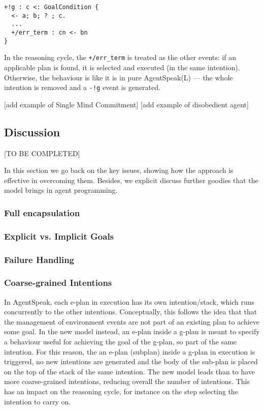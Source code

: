 {\small
\begin{verbatim}
+!g : c <: GoalCondition {
  <- a; b; ? ; c. 
  ...
  +/err_term : cn <- bn
}
\end{verbatim}}

  \noindent In the reasoning cycle, the \texttt{+/err\_term} is
  treated as the other events: if an applicable plan is found, it is
  selected and executed (in the same intention).
%
  Otherwise, the behaviour is like it is in pure AgentSpeak(L) --- the
  whole intention is removed and a \texttt{-!g} event is generated.

[add example of Single Mind Commitment]
[add example of disobedient agent]

\subsection{Discussion}

[TO BE COMPLETED]

In this section we go back on the key issues, showing how the approach is effective in overcoming them.
%
Besides, we explicit discuss further goodies that the model brings in agent programming.

\subsubsection{Full encapsulation}

\subsubsection{Explicit vs. Implicit Goals}

\subsubsection{Failure Handling}

\subsubsection{Coarse-grained Intentions}

In AgentSpeak, each e-plan in execution has its own intention/stack, which runs concurrently to the other intentions. Conceptually, this follows the idea that that the management of environment events are not part of an existing plan to achieve some goal.
%
In the new model instead, an e-plan inside a g-plan is meant to specify a behaviour useful for achieving the goal of the g-plan, so part of the same intention.
%
For this reason, the an e-plan (subplan) inside a g-plan in execution is triggered, no new intentions are generated and the body of the sub-plan is placed on the top of the stack of the same intention. 
%
The new model leads than to have more coarse-grained intentions, reducing overall the number of intentions. This has an impact on the reasoning cycle, for instance on the step selecting the intention to carry on.

